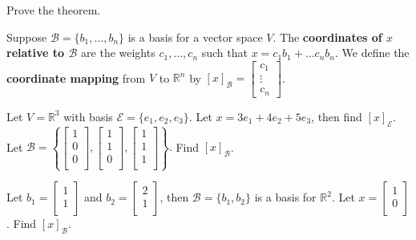 \documentclass[12pt,letterpaper]{article}
\begin{document}
\begin{enumerate}


\Problem Prove the theorem.

\vfill

\begin{defn} Suppose $\mathcal{B}=\{b_1, \dots, b_n\}$ is a basis for a vector space $V$. The {\bf coordinates of $x$ relative to $\mathcal{B}$} are the weights $c_1, \dots, c_n$ such that $x=c_1 b_1 +\dots c_n b_n$. We define the {\bf coordinate mapping} from $V$ to $\mathbb{R}^n$ by $[x]_\mathcal{B}=\begin{bmatrix} c_1\\ \vdots\\ c_n \end{bmatrix}$.
\end{defn}

\Problem Let $V=\mathbb{R}^3$ with basis $\mathcal{E}=\{e_1, e_2, e_3\}$. Let $x= 3e_1 +4e_2+5e_3$, then find $[x]_\mathcal{E}$. Let $\mathcal{B}=\left\{\begin{bmatrix} 1\\ 0\\ 0\\\end{bmatrix},\begin{bmatrix} 1\\ 1\\ 0\\\end{bmatrix},\begin{bmatrix} 1\\ 1\\ 1\\\end{bmatrix} \right\}.$ Find $[x]_\mathcal{B}$.

\vfill

\newpage

\Problem Let $b_1=\begin{bmatrix} 1\\ 1\\ \end{bmatrix}$ and $b_2=\begin{bmatrix} 2\\ 1\\ \end{bmatrix}$, then $\mathcal{B}=\{b_1, b_2\}$ is a basis for $\mathbb{R}^2$. Let $x =\begin{bmatrix} 1\\ 0\\ \end{bmatrix}$. Find $[x]_\mathcal{B}$.


\end{enumerate}
\end{document}
